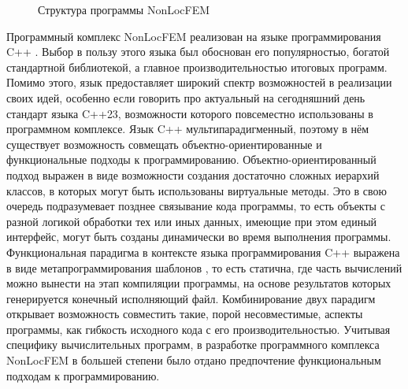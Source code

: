 \begin{figure}[ht]
    \caption{Структура программы NonLocFEM}\label{pic:NonLocFEMSchema}
\end{figure}

Программный комплекс NonLocFEM реализован на языке программирования C++ \cite{CppReference}. Выбор в пользу этого языка был обоснован его популярностью, богатой стандартной библиотекой, а главное производительностью итоговых программ. Помимо этого, язык предоставляет широкий спектр возможностей в реализации своих идей, особенно если говорить про актуальный на сегодняшний день стандарт языка C++23, возможности которого повсеместно использованы в программном комплексе. Язык C++ мультипарадигменный, поэтому в нём существует возможность совмещать объектно-ориентированные и функциональные подходы к программированию. Объектно-ориентированный подход выражен в виде возможности создания достаточно сложных иерархий классов, в которых могут быть использованы виртуальные методы. Это в свою очередь подразумевает позднее связывание кода программы, то есть объекты с разной логикой обработки тех или иных данных, имеющие при этом единый интерфейс, могут быть созданы динамически во время выполнения программы. Функциональная парадигма в контексте языка программирования C++ выражена в виде метапрограммирования шаблонов \cite{Alexandresku, Vandevoorde}, то есть статична, где часть вычислений можно вынести на этап компиляции программы, на основе результатов которых генерируется конечный исполняющий файл. Комбинирование двух парадигм открывает возможность совместить такие, порой несовместимые, аспекты программы, как гибкость исходного кода с его производительностью. Учитывая специфику вычислительных программ, в разработке программного комплекса NonLocFEM в большей степени было отдано предпочтение функциональным подходам к программированию.


